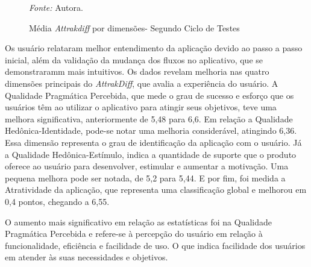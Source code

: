 \begin{figure}[h!]
	\centering
	\caption{Média \textit{Attrakdiff} por dimensões- Segundo Ciclo de Testes}
	\begin{tablenotes}[flushleft]
		\centering
		\item \textit{Fonte:} Autora.
	\end{tablenotes}
	\label{fig27}
\end{figure}

Os usuário relataram melhor entendimento da aplicação devido ao passo a passo inicial, além da validação da mudança dos fluxos no aplicativo, que se demonstraramm mais intuitivos. Os dados revelam melhoria nas quatro dimensões principais do \textit{AttrakDiff}, 
que avalia a experiência do usuário. A Qualidade Pragmática Percebida, que mede o grau de sucesso e esforço que os usuários têm ao utilizar o aplicativo para atingir seus objetivos, teve uma melhora significativa, anteriormente de 5,48 para 6,6. Em relação a 
Qualidade Hedônica-Identidade, pode-se notar uma melhoria considerável, atingindo 6,36. Essa dimensão representa o grau de identificação da aplicação com o usuário. Já a Qualidade Hedônica-Estímulo, indica a quantidade de suporte que o produto oferece ao usuário 
para desenvolver, estimular e aumentar a motivação. Uma pequena melhora pode ser notada, de 5,2 para 5,44. E por fim, foi medida a Atratividade da aplicação, que representa uma classificação global e melhorou em 0,4 pontos, chegando a 6,55.

O aumento mais significativo em relação as estatísticas foi na Qualidade Pragmática Percebida e refere-se à percepção do usuário em relação à funcionalidade, eficiência e facilidade de uso. O que indica facilidade dos usuários em atender às suas necessidades e 
objetivos.

